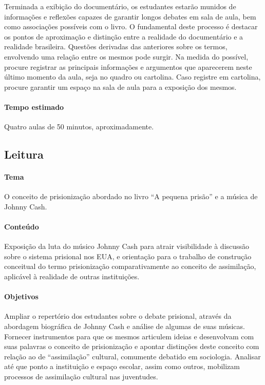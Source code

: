 \documentclass[11pt]{extarticle}
\begin{document}
Terminada a exibição do documentário, os estudantes estarão munidos de
informações e reflexões capazes de garantir longos debates em sala de
aula, bem como associações possíveis com o livro. O fundamental deste
processo é destacar os pontos de aproximação e distinção entre a
realidade do documentário e a realidade brasileira. Questões derivadas
das anteriores sobre os termos, envolvendo uma relação entre os mesmos
pode surgir. Na medida do possível, procure registrar as principais
informações e argumentos que aparecerem neste último momento da aula,
seja no quadro ou cartolina. Caso registre em cartolina, procure
garantir um espaço na sala de aula para a exposição dos mesmos.

\paragraph{Tempo estimado} Quatro aulas de 50 minutos, aproximadamente.


\subsection{Leitura}

\paragraph{Tema} O conceito de prisionização abordado no livro ``A pequena
prisão'' e a música de Johnny Cash.

\paragraph{Conteúdo} Exposição da luta do músico Johnny Cash para atrair
visibilidade à discussão sobre o sistema prisional nos EUA, e orientação
para o trabalho de construção conceitual do termo prisionização
comparativamente ao conceito de assimilação, aplicável à realidade de
outras instituições.

\paragraph{Objetivos} Ampliar o repertório dos estudantes sobre o debate
prisional, através da abordagem biográfica de Johnny Cash e análise de
algumas de suas músicas. Fornecer instrumentos para que os mesmos
articulem ideias e desenvolvam com suas palavras o conceito de
prisionização e apontar distinções deste conceito com relação ao de
``assimilação'' cultural, comumente debatido em sociologia. Analisar até
que ponto a instituição e espaço escolar, assim como outros, mobilizam
processos de assimilação cultural nas juventudes.
\end{document}
